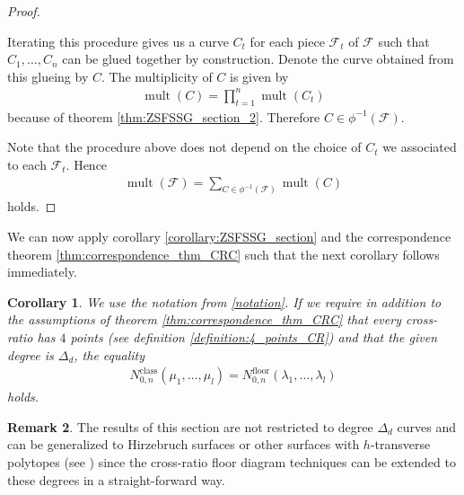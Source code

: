 \documentclass[11pt,reqno,a4]{amsart}
\theoremstyle{dotless}
\newtheorem{corollary}{Corollary}[section]
\theoremstyle{definition}
\newtheorem{remark}[corollary]{Remark}
\newcommand{\mult}{\operatorname{mult}}
\begin{document}
\begin{proof}
\begin{itemize}
\end{itemize}
Iterating this procedure gives us a curve $C_t$ for each piece $\mathcal{F}_t$ of $\mathcal{F}$ such that $C_1,\dots,C_n$ can be glued together by construction. Denote the curve obtained from this glueing by $C$. The multiplicity of $C$ is given by
\begin{align*}
\mult(C)=\prod_{t=1}^n \mult(C_t)
\end{align*}
because of theorem \ref{thm:ZSFSSG_section_2}. Therefore $C\in\phi^{-1}(\mathcal{F})$.

Note that the procedure above does not depend on the choice of $C_t$ we associated to each $\mathcal{F}_t$. Hence
\begin{align*}
\mult(\mathcal{F})=\sum_{C\in\phi^{-1}(\mathcal{F})} \mult(C)
\end{align*}
holds.
\end{proof}

We can now apply corollary \ref{corollary:ZSFSSG_section} and  the correspondence theorem \ref{thm:correspondence_thm_CRC} such that the next corollary follows immediately.


\begin{corollary}
We use the notation from \ref{notation}. If we require in addition to the assumptions of theorem \ref{thm:correspondence_thm_CRC} that every cross-ratio has $4$ points (see definition \ref{definition:4_points_CR}) and that the given degree is $\Delta_d$, the equality
\begin{align*}
N^{\textrm{class}}_{0,n}\left( \mu_1,\dots,\mu_l \right)
=
N_{0,n}^{\textrm{floor}}\left(\lambda_1,\dots,\lambda_l\right)
\end{align*}
holds.
\end{corollary}


\begin{remark}
The results of this section are not restricted to degree $\Delta_d$ curves and can be generalized to Hirzebruch surfaces or other  surfaces with $h$-transverse polytopes (see \cite{hTransverse}) since the cross-ratio floor diagram techniques can be extended to these degrees in a straight-forward way.
\end{remark}
\end{document}
